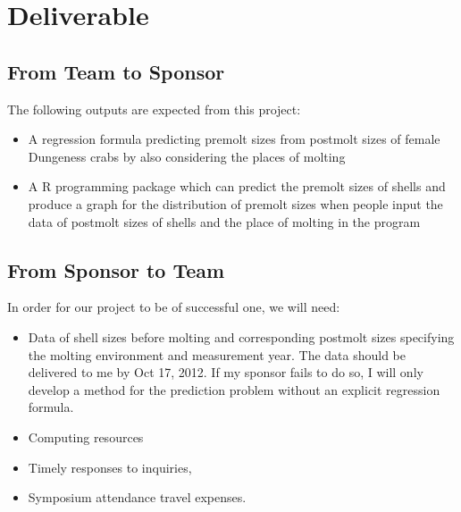 \documentclass[12pt,letterpaper]{article}
\theoremstyle{definition}
\begin{document}
\section{Deliverable}
\subsection{From Team to Sponsor} %
The following outputs are expected from this project:
\begin{itemize}
    \item A regression formula predicting premolt sizes from postmolt sizes of female Dungeness crabs by also considering the places of molting
    \item A R programming package which can predict the premolt sizes of shells and produce a graph for the distribution of premolt sizes when people input the data of postmolt sizes of shells and the place of molting in the program
\end{itemize}

\subsection{From Sponsor to Team} %

In order for our project to be of successful one, we will need:
\begin{itemize}
    \item Data of shell sizes before molting and corresponding postmolt sizes specifying the molting environment and measurement year. The data should be delivered to me by Oct 17, 2012. If my sponsor fails to do so, I will only develop a method for the prediction problem without an explicit regression formula.
    \item Computing resources
    \item Timely responses to inquiries, 
    \item Symposium attendance travel expenses.
\end{itemize}

\newpage

\nocite{*}

\end{document}
